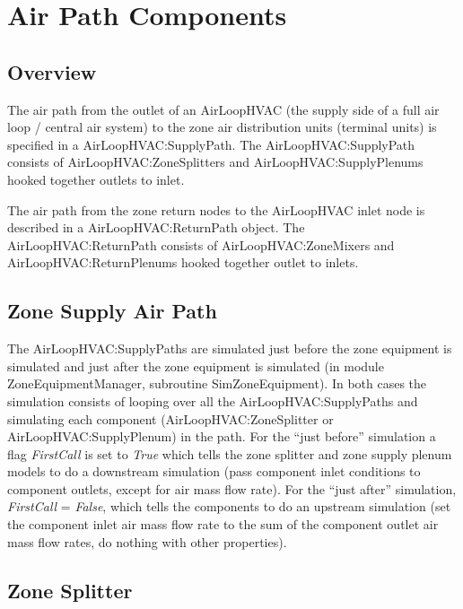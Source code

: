 \section{Air Path Components}\label{air-path-components}

\subsection{Overview}\label{overview}

The air path from the outlet of an AirLoopHVAC (the supply side of a full air loop / central air system) to the zone air distribution units (terminal units) is specified in a AirLoopHVAC:SupplyPath. The AirLoopHVAC:SupplyPath consists of AirLoopHVAC:ZoneSplitters and AirLoopHVAC:SupplyPlenums hooked together outlets to inlet.

The air path from the zone return nodes to the AirLoopHVAC inlet node is described in a AirLoopHVAC:ReturnPath object. The~ AirLoopHVAC:ReturnPath consists of AirLoopHVAC:ZoneMixers and AirLoopHVAC:ReturnPlenums hooked together outlet to inlets.

\subsection{Zone Supply Air Path}\label{zone-supply-air-path}

The AirLoopHVAC:SupplyPaths are simulated just before the zone equipment is simulated and just after the zone equipment is simulated (in module ZoneEquipmentManager, subroutine SimZoneEquipment). In both cases the simulation consists of looping over all the AirLoopHVAC:SupplyPaths and simulating each component (AirLoopHVAC:ZoneSplitter or AirLoopHVAC:SupplyPlenum) in the path. For the ``just before'' simulation a flag \emph{FirstCall} is set to \emph{True} which tells the zone splitter and zone supply plenum models to do a downstream simulation (pass component inlet conditions to component outlets, except for air mass flow rate). For the ``just after'' simulation, \emph{FirstCall} = \emph{False}, which tells the components to do an upstream simulation (set the component inlet air mass flow rate to the sum of the component outlet air mass flow rates, do nothing with other properties).

\subsection{Zone Splitter}\label{zone-splitter}

